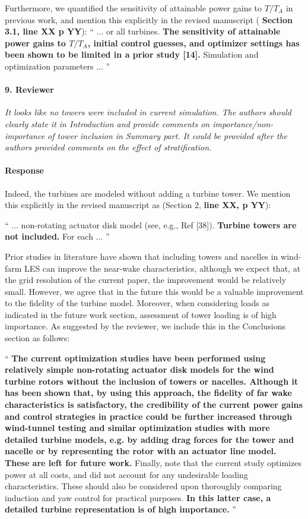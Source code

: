 \documentclass[]{article}
\newcommand{\red}[1]{\textbf{\color{red} #1}}
\newcommand{\revision}[1]{\textbf{#1}}
\begin{document}
Furthermore, we quantified the sensitivity of attainable power gains to $T/T_A$ in previous work, and mention this explicitly in the revised manuscript (\red{Section 3.1, line XX p YY}):
`` 
... or all turbines. \revision{The sensitivity of attainable power gains to $T/T_A$, initial control guesses, and optimizer settings has been shown to be limited in a prior study [14].} Simulation and optimization parameters ...
''

\hrulefill

\paragraph{9. Reviewer} \textit{It looks like no towers were included in current simulation. The authors should clearly state it in Introduction and provide comments on importance/non-importance of tower inclusion in Summary part. It could be provided after the authors provided comments on the effect of stratification.}

\paragraph{Response} Indeed, the turbines are modeled without adding a turbine tower. We mention this explicitly in the revised manuscript as (Section 2, \red{line XX, p YY}):

``
... non-rotating actuator disk model (see, e.g., Ref [38]). \revision{Turbine towers are not included.} For each ...
''

Prior studies in literature have shown that including towers and nacelles in wind-farm LES can improve the near-wake characteristics, although we expect that, at the grid resolution of the current paper, the improvement would be relatively small. However, we agree that in the future this would be a valuable improvement to the fidelity of the turbine model. Moreover, when considering loads as indicated in the future work section, assessment of tower loading is of high importance. As suggested by the reviewer, we include this in the Conclusions section as follows:

``
\revision{The current optimization studies have been performed using relatively simple non-rotating actuator disk models for the wind turbine rotors without the inclusion of towers or nacelles. Although it has been shown that, by using this approach, the fidelity of far wake characteristics is satisfactory, the credibility of the current power gains and control strategies in practice could be further increased through wind-tunnel testing and similar optimization studies with more detailed turbine models, e.g. by adding drag forces for the tower and nacelle or by representing the rotor with an actuator line model. These are left for future work.} Finally, note that the current study optimizes power at all costs, and did not account for any undesirable loading characteristics. These should also be considered upon thoroughly comparing induction and yaw control for practical purposes. \revision{In this latter case, a detailed turbine representation is of high importance.}
''
\end{document}
